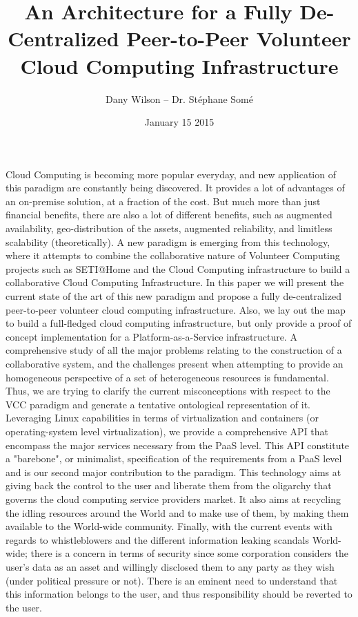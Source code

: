 \documentclass{article}
\begin{document}
\title{An Architecture for a Fully De-Centralized Peer-to-Peer Volunteer Cloud Computing Infrastructure}
\author{Dany Wilson -- Dr. St\'ephane Som\'e} 
\date{January 15 2015}

\maketitle 

Cloud Computing is becoming more popular everyday, and new application of this paradigm
are constantly being discovered. It provides a lot of advantages of an on-premise
solution, at a fraction of the cost. But much more than just financial benefits, there are
also a lot of different benefits, such as augmented availability, geo-distribution of the
assets, augmented reliability, and limitless scalability (theoretically). A new paradigm
is emerging from this technology, where it attempts to combine the collaborative nature of
Volunteer Computing projects such as SETI@Home and the Cloud Computing infrastructure to
build a collaborative Cloud Computing Infrastructure. In this paper we will present the
current state of the art of this new paradigm and propose a fully de-centralized
peer-to-peer volunteer cloud computing infrastructure. Also, we lay out the map to build a
full-fledged cloud computing infrastructure, but only provide a proof of concept
implementation for a Platform-as-a-Service infrastructure. A comprehensive study of all
the major problems relating to the construction of a collaborative system, and the
challenges present when attempting to provide an homogeneous perspective of a set of
heterogeneous resources is fundamental. Thus, we are trying to clarify the current
misconceptions with respect to the VCC paradigm and generate a tentative ontological
representation of it. Leveraging Linux capabilities in terms of virtualization and
containers (or operating-system level virtualization), we provide a comprehensive API that
encompass the major services necessary from the PaaS level. This API constitute a
"barebone", or minimalist, specification of the requirements from a PaaS level and is our
second major contribution to the paradigm. This technology aims at giving back the control
to the user and liberate them from the oligarchy that governs the cloud computing service
providers market. It also aims at recycling the idling resources around the World and to
make use of them, by making them available to the World-wide community. Finally, with the
current events with regards to whistleblowers and the different information leaking
scandals World-wide; there is a concern in terms of security since some corporation
considers the user's data as an asset and willingly disclosed them to any party as they
wish (under political pressure or not). There is an eminent need to understand that this
information belongs to the user, and thus responsibility should be reverted to the user.
\end{document}
